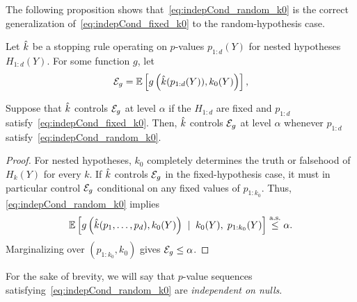 \documentclass{article}
\begin{document}
The following proposition shows that~\eqref{eq:indepCond_random_k0} is the correct generalization of~\eqref{eq:indepCond_fixed_k0} to the random-hypothesis case.
\begin{proposition}
  Let $\hat{k}$ be a stopping rule operating on $p$-values $p_{1:d}(Y)$ for nested hypotheses $H_{1:d}(Y)$. For some function $g$, let
  \[
  \mathcal{E}_g = \mathbb{E}\left[ g\left(\hat{k}(p_{1:d}(Y)), k_0(Y)\right)\right],
  \]
  
  Suppose that $\hat{k}$ controls $\mathcal{E}_g$ at level $\alpha$ if the $H_{1:d}$ are fixed and $p_{1:d}$ satisfy~\eqref{eq:indepCond_fixed_k0}. Then, $\hat{k}$ controls $\mathcal{E}_g$ at level $\alpha$ whenever $p_{1:d}$ satisfy~\eqref{eq:indepCond_random_k0}.
\end{proposition}
\begin{proof}
    For nested hypotheses, $k_0$ completely determines the truth or falsehood of $H_k(Y)$ for every $k$. If $\hat{k}$ controls $\mathcal{E}_g$ in the 
fixed-hypothesis case, it must in particular control $\mathcal{E}_g$ conditional on any fixed values of $p_{1:k_0}$. Thus, \eqref{eq:indepCond_random_k0} implies
  \[
  \mathbb{E}\left[ g\left(\hat{k}(p_1,\ldots,p_d), k_0(Y)\right) \;\mid\;
      k_0(Y), \; p_{1:k_0}(Y)\right] \overset{\textrm{a.s.}}{\leq} \alpha.
  \]
  Marginalizing over $(p_{1:k_0},k_0)$ gives $\mathcal{E}_g\leq \alpha$.
\end{proof}

For the sake of brevity, we will say that $p$-value sequences satisfying~\eqref{eq:indepCond_random_k0} are {\em independent on nulls}.
\end{document}
